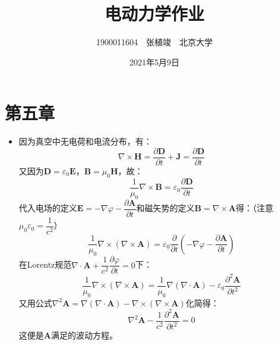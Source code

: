\documentclass[a4paper,fontset=none]{ctexart}
\begin{document}
    \title{\textbf{电动力学作业}}
    \author{1900011604\ \ 张植竣\ \ 北京大学}
    \date{2021年5月9日}
    \maketitle

    \section*{第五章}

    \begin{itemize}

        \item[4.(1)]
        因为真空中无电荷和电流分布，有：
        \[
            \nabla\times\bm{H} = \frac{\partial\bm{D}}{\partial t}+\bm{J} = \frac{\partial\bm{D}}{\partial t}
        \]
        又因为$\bm{D}=\varepsilon_0\bm{E}$，$\bm{B}=\mu_0\bm{H}$，故：
        \[
            \frac{1}{\mu_0}\nabla\times\bm{B} = \varepsilon_0\frac{\partial\bm{D}}{\partial t}
        \]
        代入电场的定义$\bm{E}=-\nabla\varphi-\dfrac{\partial\bm{A}}{\partial t}$和磁矢势的定义$\bm{B}=\nabla\times\bm{A}$得：（注意$\mu_0\varepsilon_0=\dfrac{1}{c^2}$）
        \[
            \frac{1}{\mu_0}\nabla\times(\nabla\times\bm{A}) = \varepsilon_0\frac{\partial}{\partial t}\left(-\nabla\varphi - \frac{\partial\bm{A}}{\partial t}\right)
        \]
        在Lorentz规范$\nabla\cdot\bm{A}+\dfrac{1}{c^2}\dfrac{\partial\varphi}{\partial t}=0$下：
        \[
            \frac{1}{\mu_0}\nabla\times(\nabla\times\bm{A}) = \frac{1}{\mu_0}\nabla(\nabla\cdot\bm{A}) - \varepsilon_0\frac{\partial^2\bm{A}}{\partial t^2}
        \]
        又用公式$\nabla^2\bm{A}=\nabla(\nabla\cdot\bm{A})-\nabla\times(\nabla\times\bm{A})$化简得：
        \[
            \nabla^2\bm{A} - \frac{1}{c^2}\frac{\partial^2\bm{A}}{\partial t^2} = 0
        \]
        这便是$\bm{A}$满足的波动方程。


\end{itemize}
\end{document}
